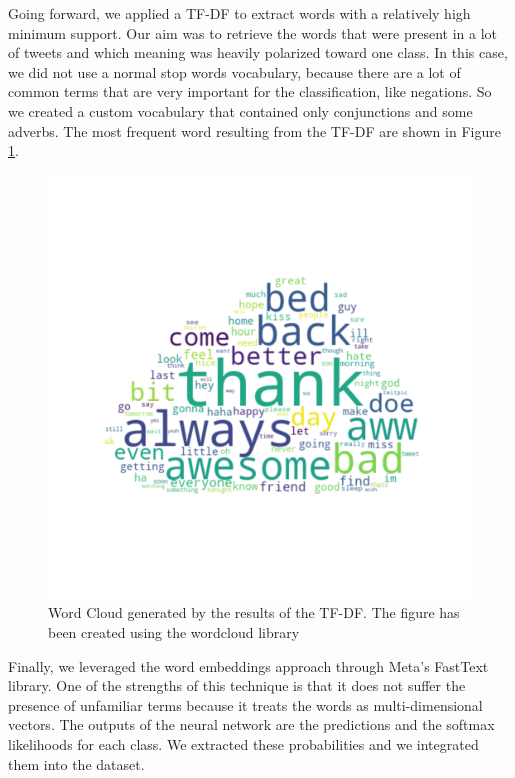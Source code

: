 \documentclass[conference]{IEEEtran}
\begin{document}
Going forward, we applied a TF-DF to extract words with a relatively high minimum support. Our aim was to retrieve the words that were present in a lot of tweets and which meaning was heavily polarized toward one class. In this case, we did not use a normal stop words vocabulary, because there are a lot of common terms that are very important for the classification, like negations. So we created a custom vocabulary that contained only conjunctions and some adverbs. The most frequent word resulting from the TF-DF are shown in Figure \ref{fig:word_cloud}.
\begin{figure}[h]
        \centering
        \includegraphics[width=\columnwidth]{word_cloud}
        \caption{Word Cloud generated by the results of the TF-DF. The figure has been created using the wordcloud library\cite{word_cloud}}
        \label{fig:word_cloud}
\end{figure}

Finally, we leveraged the word embeddings approach through Meta's FastText library. %
One of the strengths of this technique is that it does not suffer the presence of unfamiliar terms because it treats the words as multi-dimensional vectors. The outputs of the neural network are the predictions and the softmax likelihoods for each class. We extracted these probabilities and we integrated them into the dataset.
\end{document}
